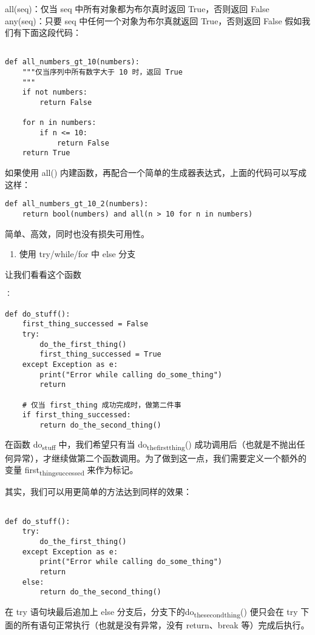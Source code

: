 \documentclass[11pt]{article}
\begin{document}
all(seq)：仅当 seq 中所有对象都为布尔真时返回 True，否则返回 False
any(seq)：只要 seq 中任何一个对象为布尔真就返回 True，否则返回 False
假如我们有下面这段代码：
\begin{verbatim}

def all_numbers_gt_10(numbers):
    """仅当序列中所有数字大于 10 时，返回 True
    """
    if not numbers:
        return False

    for n in numbers:
        if n <= 10:
            return False
    return True
\end{verbatim}
如果使用 all() 内建函数，再配合一个简单的生成器表达式，上面的代码可以写成这样：
\begin{verbatim}
def all_numbers_gt_10_2(numbers):
    return bool(numbers) and all(n > 10 for n in numbers)    
\end{verbatim}
简单、高效，同时也没有损失可用性。

\begin{enumerate}
\item 使用 try/while/for 中 else 分支
\end{enumerate}
让我们看看这个函数
\begin{verbatim}
：

def do_stuff():
    first_thing_successed = False
    try:
        do_the_first_thing()
        first_thing_successed = True
    except Exception as e:
        print("Error while calling do_some_thing")
        return

    # 仅当 first_thing 成功完成时，做第二件事
    if first_thing_successed:
        return do_the_second_thing()
\end{verbatim}
在函数 do\textsubscript{stuff} 中，我们希望只有当 do\textsubscript{the}\textsubscript{first}\textsubscript{thing}() 成功调用后（也就是不抛出任何异常），才继续做第二个函数调用。为了做到这一点，我们需要定义一个额外的变量 first\textsubscript{thing}\textsubscript{successed} 来作为标记。

其实，我们可以用更简单的方法达到同样的效果：
\begin{verbatim}

def do_stuff():
    try:
        do_the_first_thing()
    except Exception as e:
        print("Error while calling do_some_thing")
        return
    else:
        return do_the_second_thing()
\end{verbatim}
在 try 语句块最后追加上 else 分支后，分支下的do\textsubscript{the}\textsubscript{second}\textsubscript{thing}() 便只会在 try 下面的所有语句正常执行（也就是没有异常，没有 return、break 等）完成后执行。
\end{document}
